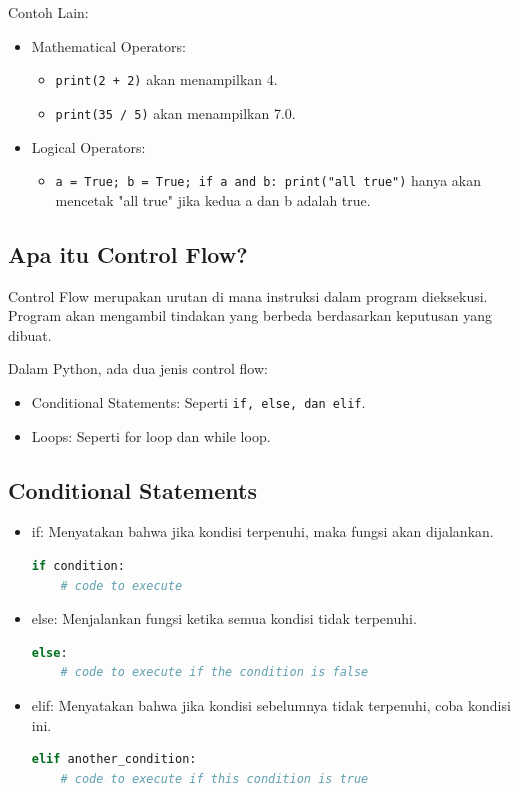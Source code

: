 \documentclass{article}
\begin{document}
Contoh Lain:
\begin{itemize}
    \item Mathematical Operators:
          \begin{itemize}
              \item \verb|print(2 + 2)| akan menampilkan 4.
              \item \verb|print(35 / 5)| akan menampilkan 7.0.
          \end{itemize}
    \item Logical Operators:
          \begin{itemize}
              \item \verb|a = True; b = True; if a and b: print("all true")| hanya akan mencetak "all true" jika kedua a dan b adalah true.
          \end{itemize}
\end{itemize}

\subsection{Apa itu Control Flow?}
Control Flow merupakan urutan di mana instruksi dalam program dieksekusi. Program akan mengambil tindakan yang berbeda berdasarkan keputusan yang dibuat.

Dalam Python, ada dua jenis control flow:
\begin{itemize}
    \item Conditional Statements: Seperti \verb|if, else, dan elif|.
    \item Loops: Seperti for loop dan while loop.
\end{itemize}

\subsection{Conditional Statements}
\begin{itemize}
    \item if: Menyatakan bahwa jika kondisi terpenuhi, maka fungsi akan dijalankan.
          \begin{lstlisting}[language=Python, caption={}, captionpos=b]
if condition:
    # code to execute
\end{lstlisting}
    \item else: Menjalankan fungsi ketika semua kondisi tidak terpenuhi.
          \begin{lstlisting}[language=Python, caption={}, captionpos=b]
else:
    # code to execute if the condition is false
\end{lstlisting}
    \item elif: Menyatakan bahwa jika kondisi sebelumnya tidak terpenuhi, coba kondisi ini.
          \begin{lstlisting}[language=Python, caption={}, captionpos=b]
elif another_condition:
    # code to execute if this condition is true
\end{lstlisting}
\end{itemize}
\end{document}
